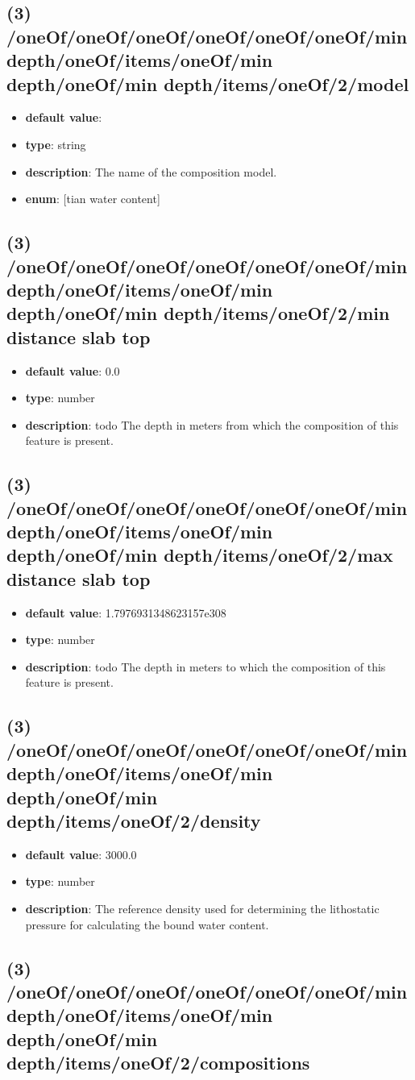 \subsection{(3) /oneOf/oneOf/oneOf/oneOf/oneOf/oneOf/min depth/oneOf/items/oneOf/min depth/oneOf/min depth/items/oneOf/2/model}
\begin{itemize}[leftmargin=3em]\item {\bf default value}: 
\item {\bf type}: string
\item {\bf description}: The name of the composition model.
\item {\bf enum}: [tian water content]\end{itemize}\subsection{(3) /oneOf/oneOf/oneOf/oneOf/oneOf/oneOf/min depth/oneOf/items/oneOf/min depth/oneOf/min depth/items/oneOf/2/min distance slab top}
\begin{itemize}[leftmargin=3em]\item {\bf default value}: 0.0
\item {\bf type}: number
\item {\bf description}: todo The depth in meters from which the composition of this feature is present.
\end{itemize}\subsection{(3) /oneOf/oneOf/oneOf/oneOf/oneOf/oneOf/min depth/oneOf/items/oneOf/min depth/oneOf/min depth/items/oneOf/2/max distance slab top}
\begin{itemize}[leftmargin=3em]\item {\bf default value}: 1.7976931348623157e308
\item {\bf type}: number
\item {\bf description}: todo The depth in meters to which the composition of this feature is present.
\end{itemize}\subsection{(3) /oneOf/oneOf/oneOf/oneOf/oneOf/oneOf/min depth/oneOf/items/oneOf/min depth/oneOf/min depth/items/oneOf/2/density}
\begin{itemize}[leftmargin=3em]\item {\bf default value}: 3000.0
\item {\bf type}: number
\item {\bf description}: The reference density used for determining the lithostatic pressure for calculating the bound water content.
\end{itemize}\subsection{(3) /oneOf/oneOf/oneOf/oneOf/oneOf/oneOf/min depth/oneOf/items/oneOf/min depth/oneOf/min depth/items/oneOf/2/compositions}
